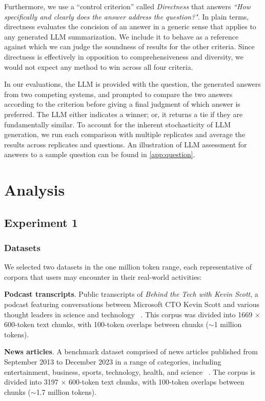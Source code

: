 \documentclass{article}
\begin{document}
Furthermore, we use a ``control criterion'' called \emph{Directness} that answers \emph{``How specifically and clearly does the answer address the question?"}.
In plain terms, directness evaluates the concision of an answer in a generic sense that applies to any generated LLM summarization.
We include it to behave as a reference against which we can judge the soundness of results for the other criteria.
Since directness is effectively in opposition to comprehensiveness and diversity, we would not expect any method to win across all four criteria.

In our evaluations, the LLM is provided with the question, the generated answers from two competing systems, and prompted to compare the two answers according to the criterion before giving a final judgment of which answer is preferred. 
The LLM either indicates a winner; or, it returns a tie if they are fundamentally similar.
To account for the inherent stochasticity of LLM generation, we run each comparison with multiple replicates and average the results across replicates and questions.
An illustration of LLM assessment for answers to a sample question can be found in \autoref{app:question}.

\section{Analysis}
\label{sec:eval}

\subsection{Experiment 1}
\subsubsection{Datasets}

We selected two datasets in the one million token range, each representative of corpora that users may encounter in their real-world activities:

\textbf{Podcast transcripts}. Public transcripts of \emph{Behind the Tech with Kevin Scott}, a podcast featuring conversations between Microsoft CTO Kevin Scott and various thought leaders in science and technology ~\citep{BehindTheTech}.
This corpus was divided into 1669 $\times$ 600-token text chunks, with 100-token overlaps between chunks ($\sim$1 million tokens).

\textbf{News articles}. A benchmark dataset comprised of news articles published from September 2013 to December 2023 in a range of categories, including entertainment, business, sports, technology, health, and science ~\citep{tang2024multihop}.
The corpus is divided into 3197 $\times$ 600-token text chunks, with 100-token overlaps between chunks ($\sim$1.7 million tokens).
\end{document}
